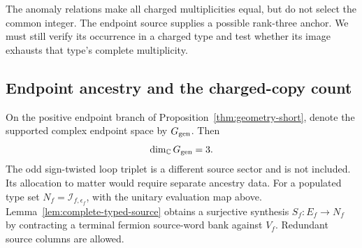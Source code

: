 \documentclass[11pt]{article}
\numberwithin{equation}{section}
\theoremstyle{definition}
\theoremstyle{remark}
\newcommand{\C}{\mathbb C}
\begin{document}
The anomaly relations make all charged multiplicities equal, but do not
select the common integer.  The endpoint source supplies a possible
rank-three anchor.  We must still verify its occurrence in a charged type
and test whether its image exhausts that type's complete multiplicity.


\subsection{Endpoint ancestry and the charged-copy count}
\label{sec:endpoint-allocation}

On the positive endpoint branch of
Proposition~\ref{thm:geometry-short}, denote the supported complex endpoint
space by $G_{\rm gen}$.  Then
\begin{equation}
 \dim_\C G_{\rm gen}=3.\label{eq:three-generations}
\end{equation}
The odd sign-twisted loop triplet is a different source sector and is not
included.  Its allocation to matter would require separate ancestry data.
For a populated type set $N_f=\mathcal I_{f,\epsilon_f}$, with the unitary
evaluation map above.  Lemma~\ref{lem:complete-typed-source} obtains a
surjective synthesis $S_f:E_f\to N_f$ by contracting a terminal fermion
source-word bank against $V_f$.  Redundant source columns are allowed.
\end{document}
